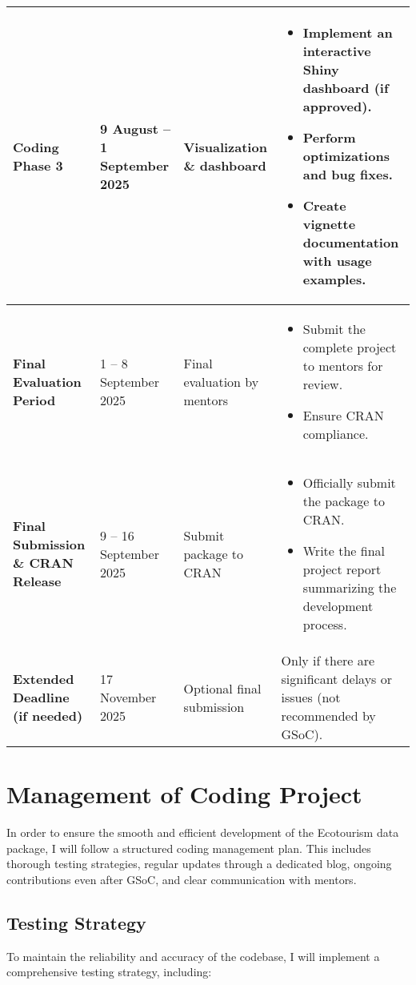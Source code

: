 \documentclass{article}
\begin{document}
\begin{longtable}{|p{3.5cm}|p{3cm}|p{3cm}|p{6.5cm}|}
\textbf{Coding Phase 3} & 9 August – 1 September 2025 & Visualization \& dashboard & 
\begin{itemize}
    \item Implement an interactive Shiny dashboard (if approved).
    \item Perform optimizations and bug fixes.
    \item Create vignette documentation with usage examples.
\end{itemize} \\
\hline

\textbf{Final Evaluation Period} & 1 – 8 September 2025 & Final evaluation by mentors & 
\begin{itemize}
    \item Submit the complete project to mentors for review.
    \item Ensure CRAN compliance.
\end{itemize} \\
\hline

\textbf{Final Submission \& CRAN Release} & 9 – 16 September 2025 & Submit package to CRAN & 
\begin{itemize}
    \item Officially submit the package to CRAN.
    \item Write the final project report summarizing the development process.
\end{itemize} \\
\hline

\textbf{Extended Deadline (if needed)} & 17 November 2025 & Optional final submission & 
Only if there are significant delays or issues (not recommended by GSoC). \\
\hline

\end{longtable}


\section{Management of Coding Project}

In order to ensure the smooth and efficient development of the Ecotourism data package, I will follow a structured coding management plan. This includes thorough testing strategies, regular updates through a dedicated blog, ongoing contributions even after GSoC, and clear communication with mentors.

\subsection{Testing Strategy}
To maintain the reliability and accuracy of the codebase, I will implement a comprehensive testing strategy, including:
\end{document}
